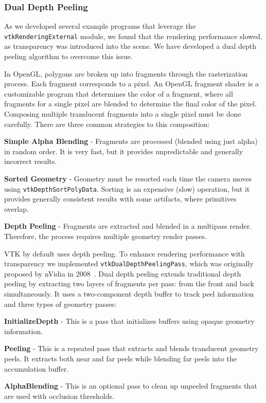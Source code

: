 \subsubsection{Dual Depth Peeling}

As we developed several example programs that leverage the \texttt{vtkRenderingExternal} module, we found that the rendering performance slowed, as transparency was introduced into the scene. We have developed a dual depth peeling algorithm to overcome this issue.

In OpenGL, polygons are broken up into fragments through the rasterization process.
Each fragment corresponds to a pixel.
An OpenGL fragment shader is a customizable program that determines the color of a fragment, where all fragments for a single pixel are blended to determine the final color of the pixel.
Composing multiple translucent fragments into a single pixel must be done carefully.
There are three common strategies to this composition:

\begin{compactitem}
\item \textbf{Simple Alpha Blending} - Fragments are processed (blended using just alpha) in random order.
  It is very fast, but it provides unpredictable and generally incorrect results.
\item \textbf{Sorted Geometry} - Geometry must be resorted each time the camera moves using \texttt{vtkDepthSortPolyData}.
  Sorting is an expensive (slow) operation, but it provides generally consistent results with some artifacts, where primitives overlap.
\item \textbf{Depth Peeling} - Fragments are extracted and blended in a multipass render. Therefore, the process requires multiple geometry render passes.
\end{compactitem}

VTK by default uses depth peeling.
To enhance rendering performance with transparency we implemented \texttt{vtkDualDepthPeelingPass}, which was originally proposed by nVidia in 2008~\cite{Bavoil:2008}.
Dual depth peeling extends traditional depth peeling by extracting two layers of fragments per pass: from the front and back simultaneously.
It uses a two-component depth buffer to track peel information and three types of geometry passes:

\begin{compactitem}
\item \textbf{InitializeDepth} - This is a pass that initializes buffers using opaque geometry information.
\item \textbf{Peeling} - This is a repeated pass that extracts and blends translucent geometry peels. It extracts both near and far peels while blending far peels into the accumulation buffer.
\item \textbf{AlphaBlending} - This is an optional pass to clean up unpeeled fragments that are used with occlusion thresholds.
\end{compactitem}

